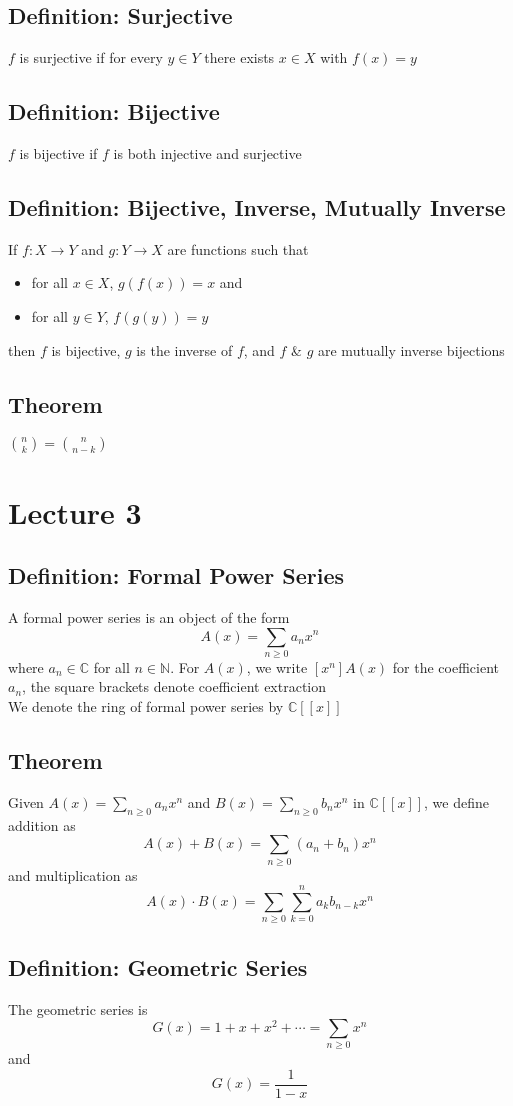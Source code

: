 \documentclass[11pt]{article}
\newcommand{\C}{{\mathbb{C}}}
\newcommand{\N}{{\mathbb{N}}}
\newcommand{\ds}{\displaystyle}
\begin{document}
\subsection{Definition: Surjective}
$f$ is surjective if for every $y\in Y$ there exists $x\in X$ with $f(x) = y$
\subsection{Definition: Bijective}
$f$ is bijective if $f$ is both injective and surjective 
\subsection{Definition: Bijective, Inverse, Mutually Inverse}
If $f: X\rightarrow Y$ and $g: Y\rightarrow X$ are functions such that 
\begin{itemize}
  \item for all $x\in X$, $g(f(x))=x$ and 
  \item for all $y\in Y$, $f(g(y))=y$
\end{itemize}
then $f$ is bijective, $g$ is the inverse of $f$, and $f$ \& $g$ are mutually inverse bijections
\subsection{Theorem}
${n\choose k} = {n\choose n-k}$

\section{Lecture 3}
\subsection{Definition: Formal Power Series}
A formal power series is an object of the form 
\[A(x) = \sum_{n\geq0}a_n x^n\]
where $a_n\in\C$ for all $n\in\N$. For $A(x)$, we write $[x^n]A(x)$ for the coefficient $a_n$, the square brackets denote coefficient extraction \\
We denote the ring of formal power series by $\C[[x]]$
\subsection{Theorem}
Given $\ds A(x)=\sum_{n\geq0}a_nx^n$ and $\ds B(x)=\sum_{n\geq0}b_nx^n$ in $\C[[x]]$, we define addition as 
\[A(x)+B(x)=\sum_{n\geq0}(a_n+b_n)x^n\]
and multiplication as 
\[A(x)\cdot B(x)=\sum_{n\geq0}\sum_{k=0}^{n}a_k b_{n-k}x^n\]
\subsection{Definition: Geometric Series}
The geometric series is \[G(x)=1+x+x^2+\cdots = \sum_{n\geq0}x^n\]
and \[G(x)=\frac{1}{1-x}\]
\end{document}
